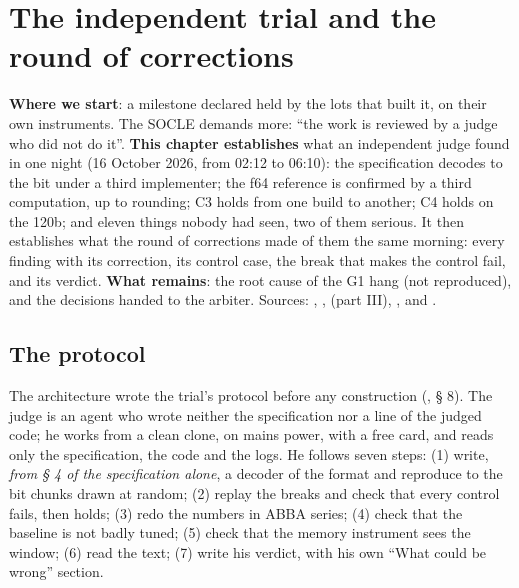 \ifdefined\GrapheResVitesse\else\fi

\chapter{The independent trial and the round of corrections}\label{ch:t2-epreuve}

\begin{origine}
\textbf{Where we start}: a milestone declared held by the lots that built it, on their own instruments. The SOCLE demands more: ``the work is reviewed by a judge who did not do it''.
\textbf{This chapter establishes} what an independent judge found in one night (16 October 2026, from 02:12 to 06:10): the specification decodes to the bit under a third implementer; the f64 reference is confirmed by a third computation, up to rounding; C3 holds from one build to another; C4 holds on the 120b; and eleven things nobody had seen, two of them serious. It then establishes what the round of corrections made of them the same morning: every finding with its correction, its control case, the break that makes the control fail, and its verdict.
\textbf{What remains}: the root cause of the G1 hang (not reproduced), and the decisions handed to the arbiter.
Sources: , ,  (part III), ,  and .
\end{origine}

\section{The protocol}\label{t2e-sec:protocole}

The architecture wrote the trial's protocol before any construction (, § 8). The judge is an agent who wrote neither the specification nor a line of the judged code; he works from a clean clone, on mains power, with a free card, and reads only the specification, the code and the logs. He follows seven steps: (1) write, \emph{from § 4 of the specification alone}, a decoder of the format and reproduce to the bit chunks drawn at random; (2) replay the breaks and check that every control fails, then holds; (3) redo the numbers in ABBA series; (4) check that the baseline is not badly tuned; (5) check that the memory instrument sees the window; (6) read the text; (7) write his verdict, with his own ``What could be wrong'' section.


